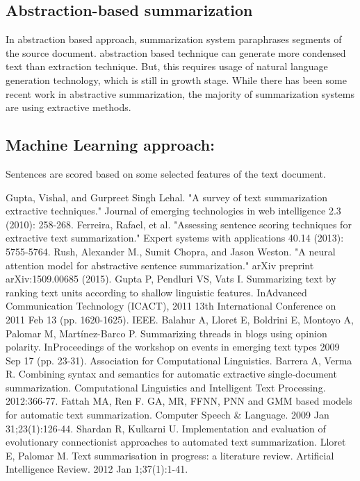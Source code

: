 \documentclass[conference]{IEEEtran}
\begin{document}
\subsection{Abstraction-based summarization}
In abstraction based approach, summarization system paraphrases segments of the source document. abstraction based technique can generate more condensed text than extraction technique. But, this requires usage of natural language generation technology, which is still in growth stage. While there has been some recent work in abstractive summarization, the majority of summarization systems are using extractive methods.\\
\subsection{Machine Learning approach:}
Sentences are scored based on some selected features of the text document.


\begin{thebibliography}{1}
Gupta, Vishal, and Gurpreet Singh Lehal. "A survey of text summarization extractive techniques." Journal of emerging technologies in web intelligence 2.3 (2010): 258-268.
Ferreira, Rafael, et al. "Assessing sentence scoring techniques for extractive text summarization." Expert systems with applications 40.14 (2013): 5755-5764.
Rush, Alexander M., Sumit Chopra, and Jason Weston. "A neural attention model for abstractive sentence summarization." arXiv preprint arXiv:1509.00685 (2015).
Gupta P, Pendluri VS, Vats I. Summarizing text by ranking text units according to shallow linguistic features. InAdvanced Communication Technology (ICACT), 2011 13th International Conference on 2011 Feb 13 (pp. 1620-1625). IEEE.
Balahur A, Lloret E, Boldrini E, Montoyo A, Palomar M, Martínez-Barco P. Summarizing threads in blogs using opinion polarity. InProceedings of the workshop on events in emerging text types 2009 Sep 17 (pp. 23-31). Association for Computational Linguistics.
Barrera A, Verma R. Combining syntax and semantics for automatic extractive single-document summarization. Computational Linguistics and Intelligent Text Processing. 2012:366-77.
Fattah MA, Ren F. GA, MR, FFNN, PNN and GMM based models for automatic text summarization. Computer Speech \& Language. 2009 Jan 31;23(1):126-44.
Shardan R, Kulkarni U. Implementation and evaluation of evolutionary connectionist approaches to automated text summarization.
Lloret E, Palomar M. Text summarisation in progress: a literature review. Artificial Intelligence Review. 2012 Jan 1;37(1):1-41.
\end{thebibliography}
\end{document}
